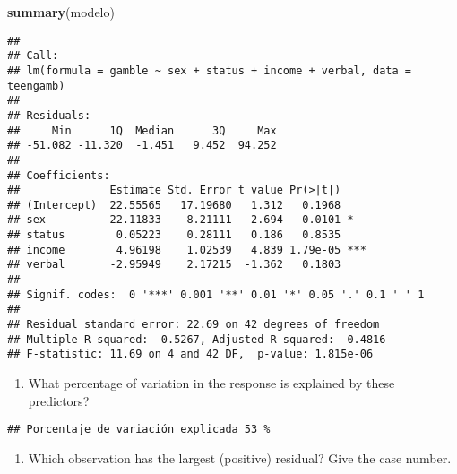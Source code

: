 \documentclass[
]{article}
\newenvironment{Shaded}{\begin{snugshade}}{\end{snugshade}}
\newcommand{\DecValTok}[1]{\textcolor[rgb]{0.00,0.00,0.81}{#1}}
\newcommand{\FunctionTok}[1]{\textcolor[rgb]{0.13,0.29,0.53}{\textbf{#1}}}
\newcommand{\NormalTok}[1]{#1}
\newcommand{\OtherTok}[1]{\textcolor[rgb]{0.56,0.35,0.01}{#1}}
\newcommand{\SpecialCharTok}[1]{\textcolor[rgb]{0.81,0.36,0.00}{\textbf{#1}}}
\newcommand{\StringTok}[1]{\textcolor[rgb]{0.31,0.60,0.02}{#1}}
\providecommand{\tightlist}{%
  \setlength{\itemsep}{0pt}\setlength{\parskip}{0pt}}
\begin{document}
\begin{Shaded}
\begin{Highlighting}[]
\FunctionTok{summary}\NormalTok{(modelo)}
\end{Highlighting}
\end{Shaded}

\begin{verbatim}
## 
## Call:
## lm(formula = gamble ~ sex + status + income + verbal, data = teengamb)
## 
## Residuals:
##     Min      1Q  Median      3Q     Max 
## -51.082 -11.320  -1.451   9.452  94.252 
## 
## Coefficients:
##              Estimate Std. Error t value Pr(>|t|)    
## (Intercept)  22.55565   17.19680   1.312   0.1968    
## sex         -22.11833    8.21111  -2.694   0.0101 *  
## status        0.05223    0.28111   0.186   0.8535    
## income        4.96198    1.02539   4.839 1.79e-05 ***
## verbal       -2.95949    2.17215  -1.362   0.1803    
## ---
## Signif. codes:  0 '***' 0.001 '**' 0.01 '*' 0.05 '.' 0.1 ' ' 1
## 
## Residual standard error: 22.69 on 42 degrees of freedom
## Multiple R-squared:  0.5267, Adjusted R-squared:  0.4816 
## F-statistic: 11.69 on 4 and 42 DF,  p-value: 1.815e-06
\end{verbatim}

\begin{enumerate}
\def\labelenumi{(\alph{enumi})}
\tightlist
\item
  What percentage of variation in the response is explained by these
  predictors?
\end{enumerate}

\begin{Shaded}
\end{Shaded}

\begin{verbatim}
## Porcentaje de variación explicada 53 %
\end{verbatim}

\begin{enumerate}
\def\labelenumi{(\alph{enumi})}
\setcounter{enumi}{1}
\tightlist
\item
  Which observation has the largest (positive) residual? Give the case
  number.
\end{enumerate}
\end{document}
